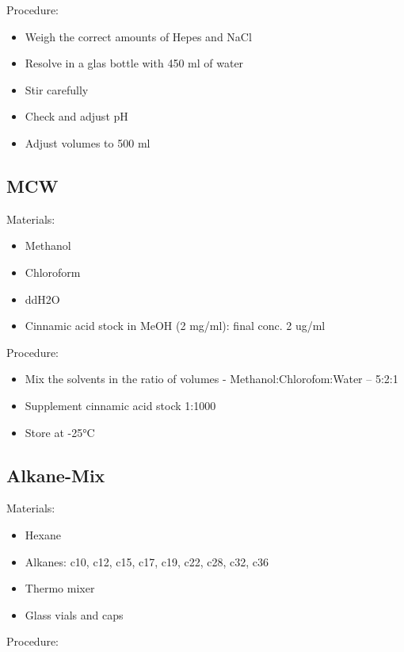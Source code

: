 \documentclass[]{book}
\providecommand{\tightlist}{%
  \setlength{\itemsep}{0pt}\setlength{\parskip}{0pt}}
\theoremstyle{definition}
\theoremstyle{definition}
\theoremstyle{definition}
\theoremstyle{remark}
\begin{document}
Procedure:

\begin{itemize}
\tightlist
\item
  Weigh the correct amounts of Hepes and NaCl
\item
  Resolve in a glas bottle with 450 ml of water
\item
  Stir carefully
\item
  Check and adjust pH
\item
  Adjust volumes to 500 ml
\end{itemize}

\subsection{MCW}\label{mcw}

Materials:

\begin{itemize}
\tightlist
\item
  Methanol
\item
  Chloroform
\item
  ddH2O
\item
  Cinnamic acid stock in MeOH (2 mg/ml): final conc. 2 ug/ml
\end{itemize}

Procedure:

\begin{itemize}
\tightlist
\item
  Mix the solvents in the ratio of volumes - Methanol:Chlorofom:Water --
  5:2:1
\item
  Supplement cinnamic acid stock 1:1000
\item
  Store at -25°C
\end{itemize}

\subsection{Alkane-Mix}\label{alkanemix}

Materials:

\begin{itemize}
\tightlist
\item
  Hexane
\item
  Alkanes: c10, c12, c15, c17, c19, c22, c28, c32, c36
\item
  Thermo mixer
\item
  Glass vials and caps
\end{itemize}

Procedure:
\end{document}
